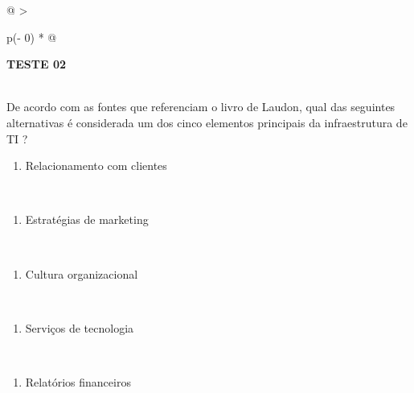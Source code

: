 \documentclass[
]{book}
\providecommand{\tightlist}{%
  \setlength{\itemsep}{0pt}\setlength{\parskip}{0pt}}
\begin{document}
\begin{longtable}[]{@{}
  >{\raggedright\arraybackslash}p{(\columnwidth - 0\tabcolsep) * }@{}}
\toprule\noalign{}
\begin{minipage}[b]{\linewidth}\raggedright
\textbf{TESTE 02}
\end{minipage} \\
\midrule\noalign{}
\endhead
\bottomrule\noalign{}
\endlastfoot
De acordo com as fontes que referenciam o livro de Laudon, qual das seguintes alternativas é considerada um dos cinco elementos principais da infraestrutura de TI ? \\
\begin{minipage}[t]{\linewidth}\raggedright
\begin{enumerate}
\def\labelenumi{\Alph{enumi})}
\tightlist
\item
  Relacionamento com clientes
\end{enumerate}
\end{minipage} \\
\begin{minipage}[t]{\linewidth}\raggedright
\begin{enumerate}
\def\labelenumi{\Alph{enumi})}
\setcounter{enumi}{1}
\tightlist
\item
  Estratégias de marketing
\end{enumerate}
\end{minipage} \\
\begin{minipage}[t]{\linewidth}\raggedright
\begin{enumerate}
\def\labelenumi{\Alph{enumi})}
\setcounter{enumi}{2}
\tightlist
\item
  Cultura organizacional
\end{enumerate}
\end{minipage} \\
\begin{minipage}[t]{\linewidth}\raggedright
\begin{enumerate}
\def\labelenumi{\Alph{enumi})}
\setcounter{enumi}{3}
\tightlist
\item
  Serviços de tecnologia
\end{enumerate}
\end{minipage} \\
\begin{minipage}[t]{\linewidth}\raggedright
\begin{enumerate}
\def\labelenumi{\Alph{enumi})}
\setcounter{enumi}{4}
\tightlist
\item
  Relatórios financeiros
\end{enumerate}
\end{minipage} \\
\end{longtable}
\end{document}
